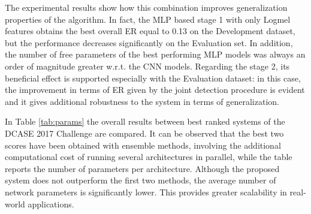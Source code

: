 \begin{table}[b]
	\centering	
	\footnotesize
	\caption{Details of models for CNN based ED stage 1 with the lowest ER on Development set. All of them use a combination of log mel energies and WC-LPE as input features.}
	\label{tab:CNN_details}
\end{table}
The experimental results show how this combination improves generalization properties of the algorithm. In fact, the MLP based stage 1 with only Logmel features obtains the best overall ER equal to 0.13 on the Development dataset, but the performance decreases significantly on the Evaluation set. In addition, the number of free parameters of the best performing MLP models was always an order of magnitude greater w.r.t. the CNN models. Regarding the stage 2, its beneficial effect is supported especially with the Evaluation dataset: in this case, the improvement in terms of ER given by the joint detection procedure is evident and it gives additional robustness to the system in terms of generalization.

In Table \ref{tab:params} the overall results between best ranked systems of the DCASE 2017 Challenge are compared. It can be observed that the best two scores have been obtained with ensemble methods, involving the additional computational cost of running several architectures in parallel, while the table reports the number of parameters per architecture. Although the proposed system does not outperform the first two methods, the average number of network parameters is significantly lower. This provides greater scalability in real-world applications.

